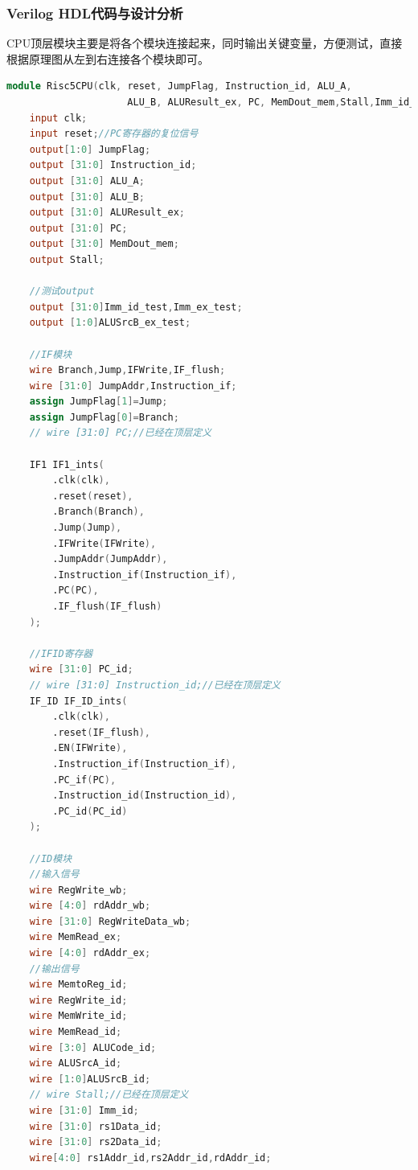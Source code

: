 \documentclass[12pt,hyperref,a4paper,UTF8]{ctexart}
\begin{document}
\subsubsection*{\Large Verilog HDL代码与设计分析}
\normalsize

CPU顶层模块主要是将各个模块连接起来，同时输出关键变量，方便测试，直接根据原理图从左到右连接各个模块即可。


\begin{lstlisting}[language=Verilog,caption=CPU顶层模块]
module Risc5CPU(clk, reset, JumpFlag, Instruction_id, ALU_A, 
                     ALU_B, ALUResult_ex, PC, MemDout_mem,Stall,Imm_id_test,Imm_ex_test,ALUSrcB_ex_test);
    input clk;
    input reset;//PC寄存器的复位信号
    output[1:0] JumpFlag;
    output [31:0] Instruction_id;
    output [31:0] ALU_A;
    output [31:0] ALU_B;
    output [31:0] ALUResult_ex;
    output [31:0] PC;
    output [31:0] MemDout_mem;
    output Stall;

    //测试output
    output [31:0]Imm_id_test,Imm_ex_test;
    output [1:0]ALUSrcB_ex_test;

    //IF模块
    wire Branch,Jump,IFWrite,IF_flush;
    wire [31:0] JumpAddr,Instruction_if;
    assign JumpFlag[1]=Jump;
    assign JumpFlag[0]=Branch;
    // wire [31:0] PC;//已经在顶层定义

    IF1 IF1_ints(
        .clk(clk),
        .reset(reset),
        .Branch(Branch),
        .Jump(Jump),
        .IFWrite(IFWrite),
        .JumpAddr(JumpAddr),
        .Instruction_if(Instruction_if),
        .PC(PC),
        .IF_flush(IF_flush)
    );

    //IFID寄存器
    wire [31:0] PC_id;
    // wire [31:0] Instruction_id;//已经在顶层定义
    IF_ID IF_ID_ints(
        .clk(clk),
        .reset(IF_flush),
        .EN(IFWrite),
        .Instruction_if(Instruction_if),
        .PC_if(PC),
        .Instruction_id(Instruction_id),
        .PC_id(PC_id)
    );

    //ID模块
    //输入信号
    wire RegWrite_wb;
    wire [4:0] rdAddr_wb;
    wire [31:0] RegWriteData_wb;
    wire MemRead_ex;
    wire [4:0] rdAddr_ex;
    //输出信号
    wire MemtoReg_id;
    wire RegWrite_id;
    wire MemWrite_id;
    wire MemRead_id;
    wire [3:0] ALUCode_id;
    wire ALUSrcA_id;
    wire [1:0]ALUSrcB_id;
    // wire Stall;//已经在顶层定义
    wire [31:0] Imm_id;
    wire [31:0] rs1Data_id;
    wire [31:0] rs2Data_id;
    wire[4:0] rs1Addr_id,rs2Addr_id,rdAddr_id;


\end{lstlisting}
\end{document}
